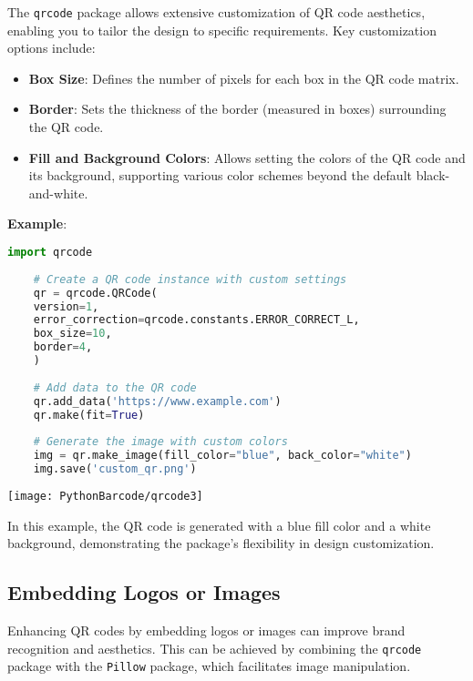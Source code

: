 The \texttt{qrcode} package allows extensive customization of QR code aesthetics, enabling you to tailor the design to specific requirements. Key customization options include:

\begin{itemize}
	\item \textbf{Box Size}: Defines the number of pixels for each box in the QR code matrix.
	\item \textbf{Border}: Sets the thickness of the border (measured in boxes) surrounding the QR code.
	\item \textbf{Fill and Background Colors}: Allows setting the colors of the QR code and its background, supporting various color schemes beyond the default black-and-white.
\end{itemize}

\bigskip

\textbf{Example}:

\begin{lstlisting}[language=Python]
	import qrcode
	
	# Create a QR code instance with custom settings
	qr = qrcode.QRCode(
	version=1,
	error_correction=qrcode.constants.ERROR_CORRECT_L,
	box_size=10,
	border=4,
	)
	
	# Add data to the QR code
	qr.add_data('https://www.example.com')
	qr.make(fit=True)
	
	# Generate the image with custom colors
	img = qr.make_image(fill_color="blue", back_color="white")
	img.save('custom_qr.png')
\end{lstlisting}

\begin{center}
	\texttt{[image: PythonBarcode/qrcode3]}
	\label{Customizing QR Code}
\end{center}

In this example, the QR code is generated with a blue fill color and a white background, demonstrating the package's flexibility in design customization.\cite{geeksforgeeksqrcode:2023}

\subsection{Embedding Logos or Images}

Enhancing QR codes by embedding logos or images can improve brand recognition and aesthetics. This can be achieved by combining the \texttt{qrcode} package with the \texttt{Pillow} package, which facilitates image manipulation.

